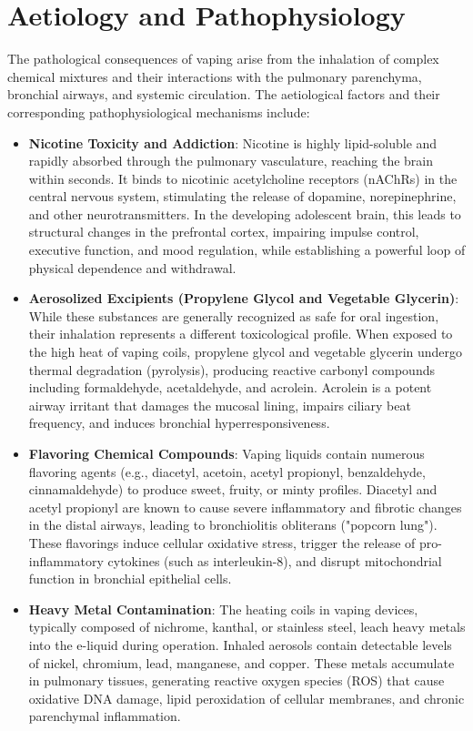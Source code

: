 \section*{Aetiology and Pathophysiology}
The pathological consequences of vaping arise from the inhalation of complex chemical mixtures and their interactions with the pulmonary parenchyma, bronchial airways, and systemic circulation. The aetiological factors and their corresponding pathophysiological mechanisms include:
\begin{itemize}
    \item \textbf{Nicotine Toxicity and Addiction}: Nicotine is highly lipid-soluble and rapidly absorbed through the pulmonary vasculature, reaching the brain within seconds. It binds to nicotinic acetylcholine receptors (nAChRs) in the central nervous system, stimulating the release of dopamine, norepinephrine, and other neurotransmitters. In the developing adolescent brain, this leads to structural changes in the prefrontal cortex, impairing impulse control, executive function, and mood regulation, while establishing a powerful loop of physical dependence and withdrawal.
    \item \textbf{Aerosolized Excipients (Propylene Glycol and Vegetable Glycerin)}: While these substances are generally recognized as safe for oral ingestion, their inhalation represents a different toxicological profile. When exposed to the high heat of vaping coils, propylene glycol and vegetable glycerin undergo thermal degradation (pyrolysis), producing reactive carbonyl compounds including formaldehyde, acetaldehyde, and acrolein. Acrolein is a potent airway irritant that damages the mucosal lining, impairs ciliary beat frequency, and induces bronchial hyperresponsiveness.
    \item \textbf{Flavoring Chemical Compounds}: Vaping liquids contain numerous flavoring agents (e.g., diacetyl, acetoin, acetyl propionyl, benzaldehyde, cinnamaldehyde) to produce sweet, fruity, or minty profiles. Diacetyl and acetyl propionyl are known to cause severe inflammatory and fibrotic changes in the distal airways, leading to bronchiolitis obliterans ("popcorn lung"). These flavorings induce cellular oxidative stress, trigger the release of pro-inflammatory cytokines (such as interleukin-8), and disrupt mitochondrial function in bronchial epithelial cells.
    \item \textbf{Heavy Metal Contamination}: The heating coils in vaping devices, typically composed of nichrome, kanthal, or stainless steel, leach heavy metals into the e-liquid during operation. Inhaled aerosols contain detectable levels of nickel, chromium, lead, manganese, and copper. These metals accumulate in pulmonary tissues, generating reactive oxygen species (ROS) that cause oxidative DNA damage, lipid peroxidation of cellular membranes, and chronic parenchymal inflammation.

\end{itemize}

